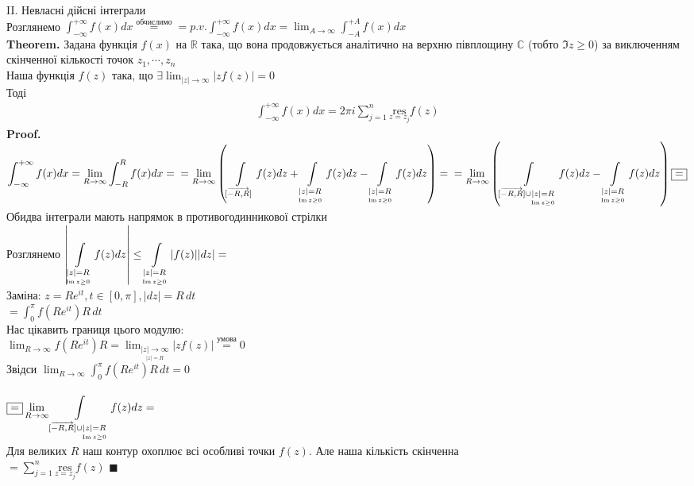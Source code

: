 \documentclass[a4paper, 14pt]{extarticle}
\def\residue#1#2{\underset{z = {#1}}{\textrm{res}} {#2}}
\def\hugespace{\vspace{5mm} \\}
\begin{document}
II. Невласні дійсні інтеграли\\
Розглянемо $\displaystyle \int_{-\infty}^{+\infty} f(x) dx \overset{\textrm{обчислимо}}{=} = p.v. \int_{-\infty}^{+\infty} f(x) dx = \lim_{A \to \infty} \int_{-A}^{+A} f(x) dx$
\hugespace
\textbf{Theorem.} Задана функція $f(x)$ на $\mathbb{R}$ така, що вона продовжується аналітично на верхню півплощину $\mathbb{C}$ (тобто $\Im z \geq 0$) за виключенням скінченної кількості точок $z_1, \cdots, z_n$\\
Наша функція $f(z)$ така, що $\displaystyle \exists \lim_{|z| \to \infty} |z f(z)| = 0$\\
Тоді \begin{align*}
\int_{-\infty}^{+\infty} f(x) dx = 2 \pi i \sum_{j=1}^n \residue{z_j}{f(z)}
\end{align*}
\textbf{Proof.}\\
$\displaystyle \int_{-\infty}^{+\infty} f(x) dx = \displaystyle \lim_{R \to \infty} \int_{-R}^{R} f(x) dx = \\
= \lim_{R \to \infty} \left(\int\displaylimits_{[\overrightarrow{-R,R}]} f(z)dz + \int\displaylimits_{\underset{\Im z \geq 0}{|z|=R}} f(z)dz - \int\displaylimits_{ \underset{\Im z \geq 0}{|z|=R}} f(z)dz \right) = \\ =
\lim_{R \to \infty} \left(\int\displaylimits_{[\overrightarrow{-R,R}] \cup \underset{\Im z \geq 0}{|z|=R}} f(z)dz - \int\displaylimits_{ \underset{\Im z \geq 0}{|z|=R}} f(z)dz \right) \boxed{=}
$\\
Обидва інтеграли мають напрямок в противогодинникової стрілки\\
Розглянемо $\displaystyle \abs{\int\displaylimits_{ \underset{\Im z \geq 0}{|z|=R}} f(z)dz} \leq \int\displaylimits_{ \underset{\Im z \geq 0}{|z|=R}} \abs{f(z)}\abs{dz} = $\\
Заміна: $z = Re^{it}, t \in [0, \pi], |dz| = R\,dt$\\
$\displaystyle = \int_0^\pi f(Re^{it}) R\,dt$\\
Нас цікавить границя цього модулю:\\
$\displaystyle \lim_{R \to \infty} f(Re^{it})R = \lim_{\underset{|z|=R}{|z| \to \infty}} |z f(z)| \overset{\textrm{умова}}{=} 0$\\
Звідси $\displaystyle \lim_{R \to \infty} \int_0^\pi f(Re^{it}) R\,dt = 0$\\
\\
$\displaystyle \boxed{=}  \lim_{R \to \infty} \int\displaylimits_{[\overrightarrow{-R,R}] \cup \underset{\Im z \geq 0}{|z|=R}} f(z)dz = $\\
Для великих $R$ наш контур охоплює всі особливі точки $f(z)$. Але наша кількість скінченна\\
$\displaystyle = \sum_{j=1}^n \residue{z_j}{f(z)}$ $\blacksquare$
\hugespace
\end{document}
